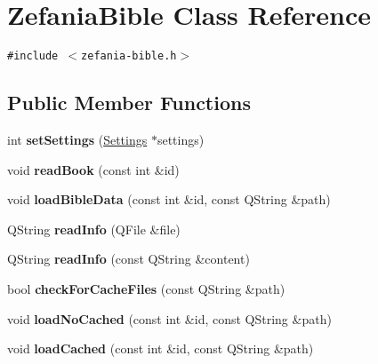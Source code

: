 \hypertarget{classZefaniaBible}{
\section{ZefaniaBible Class Reference}
\label{classZefaniaBible}
}
{\tt \#include $<$zefania-bible.h$>$}

\subsection*{Public Member Functions}
\begin{CompactItemize}
\item 
\hypertarget{classZefaniaBible_f52a3af3cf5027e377252b0d65060467}{
int \textbf{setSettings} (\hyperlink{classSettings}{Settings} $\ast$settings)}
\label{classZefaniaBible_f52a3af3cf5027e377252b0d65060467}

\item 
\hypertarget{classZefaniaBible_35afefc88d8403c025125b8bf7e325f3}{
void \textbf{readBook} (const int \&id)}
\label{classZefaniaBible_35afefc88d8403c025125b8bf7e325f3}

\item 
\hypertarget{classZefaniaBible_ef886a2ed5d65079d2625cacfc68130c}{
void \textbf{loadBibleData} (const int \&id, const QString \&path)}
\label{classZefaniaBible_ef886a2ed5d65079d2625cacfc68130c}

\item 
\hypertarget{classZefaniaBible_530b3de742b09436a6698140c428a51a}{
QString \textbf{readInfo} (QFile \&file)}
\label{classZefaniaBible_530b3de742b09436a6698140c428a51a}

\item 
\hypertarget{classZefaniaBible_2295f264abb8c603d6160d004327f9b9}{
QString \textbf{readInfo} (const QString \&content)}
\label{classZefaniaBible_2295f264abb8c603d6160d004327f9b9}

\item 
\hypertarget{classZefaniaBible_1d61a2c885f658724582ff7d0edcdd57}{
bool \textbf{checkForCacheFiles} (const QString \&path)}
\label{classZefaniaBible_1d61a2c885f658724582ff7d0edcdd57}

\item 
\hypertarget{classZefaniaBible_793f3c3f996c76f99185f3b918f46ab8}{
void \textbf{loadNoCached} (const int \&id, const QString \&path)}
\label{classZefaniaBible_793f3c3f996c76f99185f3b918f46ab8}

\item 
\hypertarget{classZefaniaBible_e01531c68bf9386d8a5832c46b345035}{
void \textbf{loadCached} (const int \&id, const QString \&path)}
\label{classZefaniaBible_e01531c68bf9386d8a5832c46b345035}


\end{CompactItemize}
